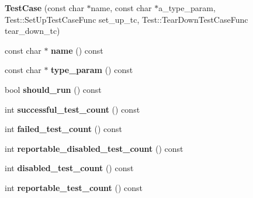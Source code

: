 \begin{DoxyCompactItemize}
\item 
\hypertarget{classtesting_1_1_test_case_a8a43b04703bfc7d56597fcb9b76ffbf5}{}{\bfseries Test\+Case} (const char $\ast$name, const char $\ast$a\+\_\+type\+\_\+param, Test\+::\+Set\+Up\+Test\+Case\+Func set\+\_\+up\+\_\+tc, Test\+::\+Tear\+Down\+Test\+Case\+Func tear\+\_\+down\+\_\+tc)\label{classtesting_1_1_test_case_a8a43b04703bfc7d56597fcb9b76ffbf5}

\item 
\hypertarget{classtesting_1_1_test_case_af4dfd4ece8e66520a30e6a9fbd9d43aa}{}const char $\ast$ {\bfseries name} () const \label{classtesting_1_1_test_case_af4dfd4ece8e66520a30e6a9fbd9d43aa}

\item 
\hypertarget{classtesting_1_1_test_case_a2052c095bc6ac9c0ab1cae6f0e2d9fc9}{}const char $\ast$ {\bfseries type\+\_\+param} () const \label{classtesting_1_1_test_case_a2052c095bc6ac9c0ab1cae6f0e2d9fc9}

\item 
\hypertarget{classtesting_1_1_test_case_a0e49de754452943d88e3083e6cdded00}{}bool {\bfseries should\+\_\+run} () const \label{classtesting_1_1_test_case_a0e49de754452943d88e3083e6cdded00}

\item 
\hypertarget{classtesting_1_1_test_case_a8fb3974ccb5242ad9d1d633d53c0f730}{}int {\bfseries successful\+\_\+test\+\_\+count} () const \label{classtesting_1_1_test_case_a8fb3974ccb5242ad9d1d633d53c0f730}

\item 
\hypertarget{classtesting_1_1_test_case_ae74e7a2e75d07f9feca2c3384604cb01}{}int {\bfseries failed\+\_\+test\+\_\+count} () const \label{classtesting_1_1_test_case_ae74e7a2e75d07f9feca2c3384604cb01}

\item 
\hypertarget{classtesting_1_1_test_case_a4ec19c0058282562c0cc2c0e87d4b211}{}int {\bfseries reportable\+\_\+disabled\+\_\+test\+\_\+count} () const \label{classtesting_1_1_test_case_a4ec19c0058282562c0cc2c0e87d4b211}

\item 
\hypertarget{classtesting_1_1_test_case_ac1e3cd2b598f19ce10e42b3421508a9e}{}int {\bfseries disabled\+\_\+test\+\_\+count} () const \label{classtesting_1_1_test_case_ac1e3cd2b598f19ce10e42b3421508a9e}

\item 
\hypertarget{classtesting_1_1_test_case_a7693150fa71d460a19b291ed6f5c18bd}{}int {\bfseries reportable\+\_\+test\+\_\+count} () const \label{classtesting_1_1_test_case_a7693150fa71d460a19b291ed6f5c18bd}


\end{DoxyCompactItemize}
